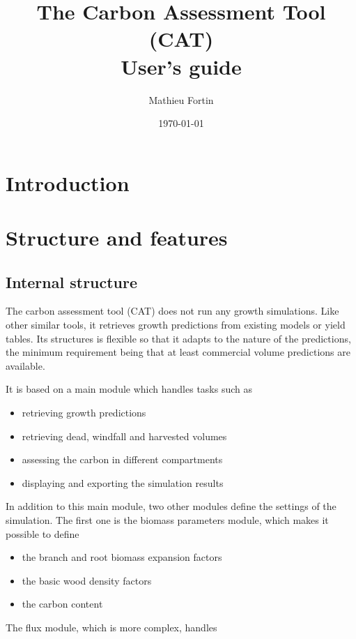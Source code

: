 \documentclass[a4paper,12pt]{report}
\title{The Carbon Assessment Tool (CAT) \\ User's guide}
\author{Mathieu Fortin}
\date{\today}
\begin{document}
\maketitle
\tableofcontents

\listoffigures
\listoftables

\chapter{Introduction}

\chapter{Structure and features}

\section{Internal structure}

The carbon assessment tool (CAT) does not run any growth simulations. Like other similar tools, it retrieves growth predictions from existing models or yield tables. Its structures is flexible so that it adapts to the nature of the predictions, the minimum requirement being that at least commercial volume predictions are available. 

It is based on a main module which handles tasks such as
\begin{itemize}
\item retrieving growth predictions
\item retrieving dead, windfall and harvested volumes
\item assessing the carbon in different compartments 
\item displaying and exporting the simulation results 
\end{itemize}

In addition to this main module, two other modules define the settings of the simulation. The first one is the biomass parameters module, which makes it possible to define 

\begin{itemize}
\item the branch and root biomass expansion factors 
\item the basic wood density factors
\item the carbon content
\end{itemize}

The flux module, which is more complex, handles 
\end{document}

